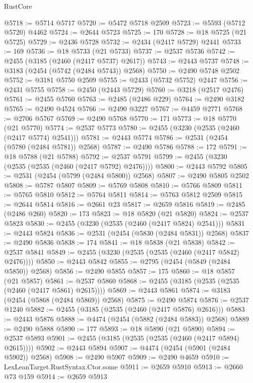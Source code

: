 \begin{lexlean}{RustCore}
\begin{coremodule}
@5718 := @5714 @5717
@5720 := @5472 @5718 @2509
@5723 := @5593 (@5712 @5720) @4462
@5724 := @2644 @5723
@5725 := 170
@5728 := @18 @5725 (@21 @5725)
@5729 := @2436 @5728
@5732 := @2434 (@2417 @5729) @2441
@5733 := 169
@5736 := @18 @5733 (@21 @5733)
@5737 := @2537 @5736
@5742 := @2455 (@3185 (@2460 (@2417 @5737) @2617))
@5743 := @2443 @5737
@5748 := @3183 (@2454 (@5742 (@2484 @5743)) @2568)
@5750 := @2490 @5748 @2502
@5752 := @3181 @5750 @2509
@5755 := @2433 (@5732 @5752) @2447
@5756 := @2431 @5755
@5758 := @2450 (@2443 @5729)
@5760 := @3218 (@2517 @2476)
@5761 := @2455 @5760
@5763 := @2485 (@2486 @229)
@5764 := @2490 @3182
@5765 := @2490 @4524
@5766 := @2490 @3227
@5767 := @4459 @2771
@5768 := @2706 @5767
@5769 := @2490 @5768
@5770 := 171
@5773 := @18 @5770 (@21 @5770)
@5774 := @2537 @5773
@5780 := @2455 (@3230 (@2535 (@2460 (@2417 @5774) @2541)))
@5781 := @2443 @5774
@5786 := @2531 (@2454 (@5780 (@2484 @5781)) @2568)
@5787 := @2490 @5786
@5788 := 172
@5791 := @18 @5788 (@21 @5788)
@5792 := @2537 @5791
@5799 := @2455 (@3230 (@2535 (@2535 (@2460 (@2417 @5792) @2476))))
@5800 := @2443 @5792
@5805 := @2531 (@2454 (@5799 (@2484 @5800)) @2568)
@5807 := @2490 @5805 @2502
@5808 := @5787 @5807
@5809 := @5769 @5808
@5810 := @5766 @5809
@5811 := @5765 @5810
@5812 := @5764 @5811
@5814 := @5763 @5812 @2509
@5815 := @2644 @5814
@5816 := @2661 @23
@5817 := @2659 @5816
@5819 := @2485 (@2486 @260)
@5820 := 173
@5823 := @18 @5820 (@21 @5820)
@5824 := @2537 @5823
@5830 := @2455 (@3230 (@2535 (@2460 (@2417 @5824) @2541)))
@5831 := @2443 @5824
@5836 := @2531 (@2454 (@5830 (@2484 @5831)) @2568)
@5837 := @2490 @5836
@5838 := 174
@5841 := @18 @5838 (@21 @5838)
@5842 := @2537 @5841
@5849 := @2455 (@3230 (@2535 (@2535 (@2460 (@2417 @5842) @2476))))
@5850 := @2443 @5842
@5855 := @2795 (@2454 (@5849 (@2484 @5850)) @2568)
@5856 := @2490 @5855
@5857 := 175
@5860 := @18 @5857 (@21 @5857)
@5861 := @2537 @5860
@5868 := @2455 (@3185 (@2535 (@2535 (@2460 (@2417 @5861) @2615))))
@5869 := @2443 @5861
@5874 := @3183 (@2454 (@5868 (@2484 @5869)) @2568)
@5875 := @2490 @5874
@5876 := @2537 @1240
@5882 := @2455 (@3185 (@2535 (@2460 (@2417 @5876) @2616)))
@5883 := @2443 @5876
@5888 := @4474 (@2454 (@5882 (@2484 @5883)) @2568)
@5889 := @2490 @5888
@5890 := 177
@5893 := @18 @5890 (@21 @5890)
@5894 := @2537 @5893
@5901 := @2455 (@3185 (@2535 (@2535 (@2460 (@2417 @5894) @2615))))
@5902 := @2443 @5894
@5907 := @4474 (@2454 (@5901 (@2484 @5902)) @2568)
@5908 := @2490 @5907
@5909 := @2490 @4659
@5910 := LexLeanTarget.RustSyntax.Ctor.some
@5911 := @2659 @5910
@5913 := @2660 @73 @159
@5914 := @2659 @5913

\end{coremodule}
\end{lexlean}

